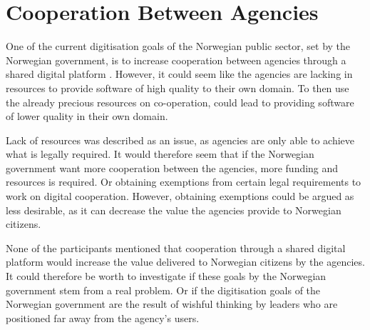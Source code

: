 

\section{Cooperation Between Agencies}
One of the current digitisation goals of the Norwegian public sector, set by the Norwegian government, is to increase cooperation between agencies through a shared digital platform \cite{r_2019}. However, it could seem like the agencies are lacking in resources to provide software of high quality to their own domain. To then use the already precious resources on co-operation, could lead to providing software of lower quality in their own domain. 

Lack of resources was described as an issue, as agencies are only able to achieve what is legally required. It would therefore seem that if the Norwegian government want more cooperation between the agencies, more funding and resources is required. Or obtaining exemptions from certain legal requirements to work on digital cooperation. However, obtaining exemptions could be argued as less desirable, as it can decrease the value the agencies provide to Norwegian citizens.

None of the participants mentioned that cooperation through a shared digital platform would increase the value delivered to Norwegian citizens by the agencies. It could therefore be worth to investigate if these goals by the Norwegian government stem from a real problem. Or if the digitisation goals of the Norwegian government are the result of wishful thinking by leaders who are positioned far away from the agency's users. 

